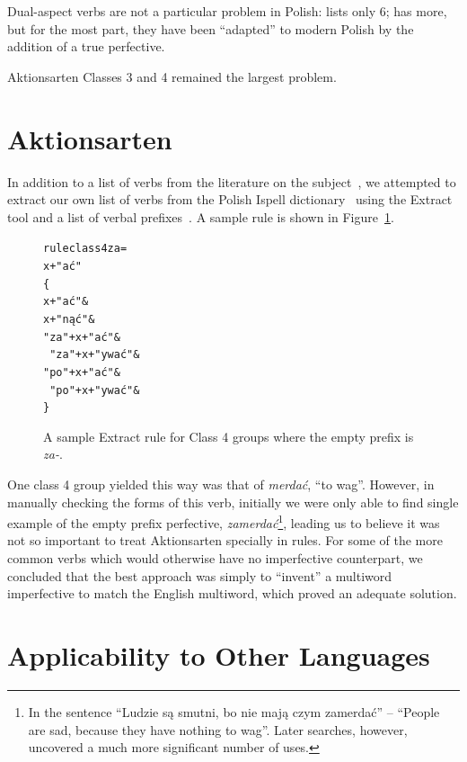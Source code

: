 \documentclass[11pt]{article}
\begin{document}
Dual-aspect verbs are not a particular problem in Polish: \cite{jagod} 
lists only 6; \cite{futrega} has more, but for the most part, they
have been ``adapted'' to modern Polish by the addition of a true
perfective.

Aktionsarten Classes 3 and 4 remained the largest problem.

\section{Aktionsarten}

In addition to a list of verbs from the literature on the 
subject~\citep{aalstein07}, we attempted to extract our own list of verbs
from the Polish Ispell dictionary~\citep{futrega} using the Extract
tool\citep{forsberg07} and a list of verbal prefixes~\citep[5.15.2]{bielec}.
A sample rule is shown in Figure~\ref{figure:extract}.

\begin{figure}[htbp]
\begin{small}
\begin{alltt}
rule class4za = 
x+"ać"
\{ 
  x+"ać" \&
  x+"nąć" \&
  "za"+x+"ać" \&
  ~"za"+x+"ywać" \&
  "po"+x+"ać" \&
  ~"po"+x+"ywać" \&
\}
\end{alltt}
\end{small}
\caption{A sample Extract rule for Class 4 groups where the
empty prefix is {\it za-}.}
\label{figure:extract}
\end{figure}

One class 4 group yielded this way was that of {\it merda\'{c}},
``to wag''. However, in manually checking the forms of this verb,
initially we were only able to find single example of the empty prefix 
perfective, {\it zamerda\'{c}}\footnote{In the sentence ``Ludzie s\k{a}
smutni, bo nie maj\k{a} czym zamerda\'{c}'' -- ``People are sad, because
they have nothing to wag''. Later searches, however, uncovered a much 
more significant number of uses.}, leading us to believe it was not so
important to treat Aktionsarten specially in rules. For some of
the more common verbs which would otherwise have no imperfective
counterpart, we concluded that the best approach was simply to ``invent'' 
a multiword imperfective to match the English multiword, which
proved an adequate solution.

\section{Applicability to Other Languages}
\end{document}
